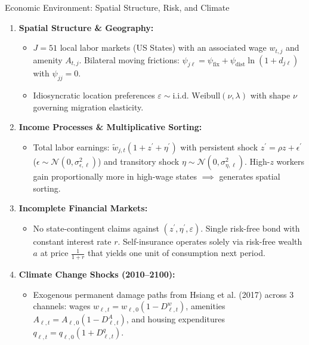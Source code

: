 \documentclass[aspectratio=169, 10pt]{beamer}
\begin{document}
\begin{frame}{Economic Environment: Spatial Structure, Risk, and Climate \hfill \hyperlink{backup:migration_frictions}{\scriptsize{}}}\label{main:environment}
    \begin{enumerate}\small\setlength{\itemsep}{4pt}
        \item \textbf{Spatial Structure \& Geography:}
        \begin{itemize}\footnotesize
            \item $J = 51$ local labor markets (US States) with an associated wage $w_{t,j}$ and amenity $A_{t,j}$. Bilateral moving frictions: $\psi_{j\ell} = \psi_{\text{fix}} + \psi_{\text{dist}} \ln(1 + d_{j\ell})$ with $\psi_{jj}=0$.
            \item Idiosyncratic location preferences $\varepsilon \sim \text{i.i.d. Weibull}(\nu, \lambda)$ with shape $\nu$ governing migration elasticity.
        \end{itemize}
        \item \textbf{Income Processes \& Multiplicative Sorting:}
        \begin{itemize}\footnotesize
            \item Total labor earnings: $\tilde{w}_{j,t}(1 + z^\prime + \eta^\prime)$ with persistent shock $z^\prime = \rho z + \epsilon^\prime$ ($\epsilon \sim \mathcal{N}(0, \sigma_{\epsilon,\ell}^2)$) and transitory shock $\eta \sim \mathcal{N}(0, \sigma_{\eta,\ell}^2)$. High-$z$ workers gain proportionally more in high-wage states $\implies$ generates spatial sorting.
        \end{itemize}
        \item \textbf{Incomplete Financial Markets:}
        \begin{itemize}\footnotesize
            \item No state-contingent claims against $(z^\prime, \eta^\prime, \varepsilon)$. Single risk-free bond with constant interest rate $r$. Self-insurance operates solely via risk-free wealth $a$ at price $\frac{1}{1+r}$ that yields one unit of consumption next period.
        \end{itemize}
        \item \textbf{Climate Change Shocks (2010--2100):}
        \begin{itemize}\footnotesize
            \item Exogenous permanent damage paths from Hsiang et al. (2017) across 3 channels: wages $w_{\ell,t} = w_{\ell,0}(1 - D^w_{\ell,t})$, amenities $A_{\ell,t} = A_{\ell,0}(1 - D^A_{\ell,t})$, and housing expenditures $q_{\ell,t} = q_{\ell,0}(1 + D^q_{\ell,t})$.
        \end{itemize}
    \end{enumerate}
\end{frame}
\end{document}
